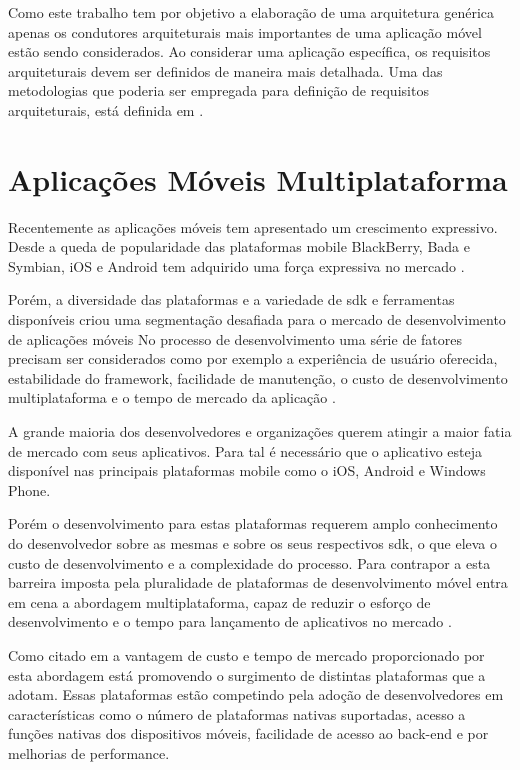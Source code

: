 \documentclass[
	article,			%
	11pt,				%
	oneside,			%
	a4paper,			%
	english,			%
	brazil,				%
	sumario=tradicional
]{abntex2}
\begin{document}
Como este trabalho tem por objetivo a elaboração de uma arquitetura genérica apenas os condutores arquiteturais mais importantes de uma aplicação móvel estão sendo considerados. Ao considerar uma aplicação específica, os requisitos arquiteturais devem ser definidos de maneira mais detalhada. Uma das metodologias que poderia ser empregada para definição de requisitos arquiteturais, está definida em \cite{eeles2005capturing}.

\section{Aplicações Móveis Multiplataforma}
Recentemente as aplicações móveis tem apresentado um crescimento expressivo. Desde a queda de popularidade das plataformas mobile BlackBerry, Bada e Symbian, iOS e Android tem adquirido uma força expressiva no mercado \cite{dalmasso2013survey}.

Porém, a diversidade das plataformas e a variedade de \gls{sdk} e ferramentas disponíveis criou uma segmentação desafiada para o mercado de desenvolvimento de aplicações móveis No processo de desenvolvimento uma série de fatores precisam ser considerados como por exemplo a experiência de usuário oferecida, estabilidade do framework, facilidade de manutenção, o custo de desenvolvimento multiplataforma e o tempo de mercado da aplicação \cite{dalmasso2013survey}.

A grande maioria dos desenvolvedores e organizações querem atingir a maior fatia de mercado com seus aplicativos. Para tal é necessário que o aplicativo esteja disponível nas principais plataformas mobile como o iOS, Android e Windows Phone. 

Porém o desenvolvimento para estas plataformas requerem amplo conhecimento do desenvolvedor sobre as mesmas e sobre os seus respectivos \gls{sdk}, o que eleva o custo de desenvolvimento e a complexidade do processo. Para contrapor a esta barreira imposta pela pluralidade de plataformas de desenvolvimento móvel entra em cena a abordagem multiplataforma, capaz de reduzir o esforço de desenvolvimento e o tempo para lançamento de aplicativos no mercado \cite{dalmasso2013survey}.

Como citado em \cite{shehab2014reducing} a vantagem de custo e tempo de mercado proporcionado por esta abordagem está promovendo o surgimento de distintas plataformas que a adotam. Essas plataformas estão competindo pela adoção de desenvolvedores em características como o número de plataformas nativas suportadas, acesso a funções nativas dos dispositivos móveis, facilidade de acesso ao \gls{back-end} e por melhorias de performance. 
\end{document}
